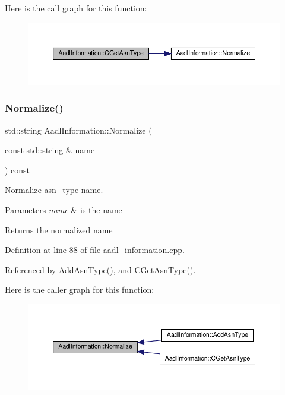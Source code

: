 Here is the call graph for this function\+:
\nopagebreak
\begin{figure}[H]
\begin{center}
\leavevmode
\includegraphics[width=350pt]{d2/df6/classAadlInformation_a0b0282f4f689aa9e7e0d5ed533d9cfde_cgraph}
\end{center}
\end{figure}
\mbox{\label{classAadlInformation_a26a3bb9e09194a9db389ebfdf507db88}} 
\subsubsection{\texorpdfstring{Normalize()}{Normalize()}}
{\footnotesize\ttfamily std\+::string Aadl\+Information\+::\+Normalize (\begin{DoxyParamCaption}\item[{const std\+::string \&}]{name }\end{DoxyParamCaption}) const\hspace{0.3cm}{\ttfamily [protected]}}



Normalize asn\+\_\+type name. 


\begin{DoxyParams}{Parameters}
{\em name} & is the name \\
\hline
\end{DoxyParams}
\begin{DoxyReturn}{Returns}
the normalized name 
\end{DoxyReturn}


Definition at line 88 of file aadl\+\_\+information.\+cpp.



Referenced by Add\+Asn\+Type(), and C\+Get\+Asn\+Type().

Here is the caller graph for this function\+:
\nopagebreak
\begin{figure}[H]
\begin{center}
\leavevmode
\includegraphics[width=350pt]{d2/df6/classAadlInformation_a26a3bb9e09194a9db389ebfdf507db88_icgraph}
\end{center}
\end{figure}


